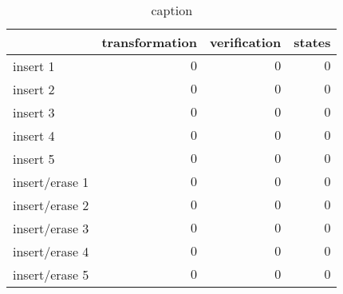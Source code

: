 \begin{table}
  \begin{center}
    \begin{tabularx}{\textwidth}{l r r r}
      \toprule
        & transformation & verification & states \\
      \midrule
      insert 1 & $0$ & $0$ & $0$ \\
      insert 2 & $0$ & $0$ & $0$ \\
      insert 3 & $0$ & $0$ & $0$ \\
      insert 4 & $0$ & $0$ & $0$ \\
      insert 5 & $0$ & $0$ & $0$ \\
      \midrule
      insert/erase 1 & $0$ & $0$ & $0$ \\
      insert/erase 2 & $0$ & $0$ & $0$ \\
      insert/erase 3 & $0$ & $0$ & $0$ \\
      insert/erase 4 & $0$ & $0$ & $0$ \\
      insert/erase 5 & $0$ & $0$ & $0$ \\
      \bottomrule
    \end{tabularx}
  \end{center}
  \caption{caption}
\end{table}
